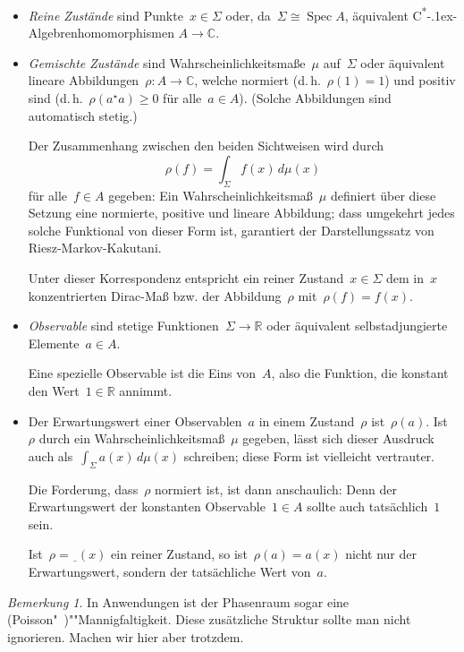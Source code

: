 \documentclass[a4paper,ngerman,12pt]{scrartcl}
\theoremstyle{definition}
\theoremstyle{plain}
\theoremstyle{remark}
\newtheorem{bem}[defn]{Bemerkung}
\newcommand{\RR}{\mathbb{R}}
\newcommand{\CC}{\mathbb{C}}
\newcommand{\freist}{\underline{\ \ }}
\newcommand{\csalgebren}{C\textsuperscript{*}\kern-.1ex-Alge\-bren}
\DeclareMathOperator{\Spec}{Spec}
\renewcommand{\_}{\mathpunct{.}\,}
\newcommand{\?}{\,{:}\,}
\begin{document}
\begin{itemize}
\item \emph{Reine Zustände} sind Punkte~$x \in \Sigma$ oder, da~$\Sigma \cong \Spec
A$, äquivalent \csalgebren{}\-ho\-mo\-mor\-phis\-men $A \to \CC$.

\item \emph{Gemischte Zustände} sind Wahrscheinlichkeitsmaße~$\mu$ auf~$\Sigma$ oder
äquivalent lineare Abbildungen~$\rho : A \to \CC$, welche normiert
(d.\,h.~$\rho(1) = 1$) und positiv sind (d.\,h.~$\rho(a^\star a) \geq 0$
für alle~$a \in A$). (Solche Abbildungen sind automatisch stetig.)

Der Zusammenhang zwischen den beiden Sichtweisen wird durch
\[ \rho(f) = \int_\Sigma f(x) \,d\mu(x) \]
für alle~$f \in A$ gegeben: Ein Wahrscheinlichkeitsmaß~$\mu$ definiert über
diese Setzung eine normierte, positive und lineare Abbildung; dass umgekehrt
jedes solche Funktional von dieser Form ist, garantiert der Darstellungssatz
von Riesz-Markov-Kakutani.

Unter dieser Korrespondenz entspricht ein reiner Zustand~$x \in \Sigma$ dem
in~$x$ konzentrierten Dirac-Maß bzw. der Abbildung~$\rho$ mit~$\rho(f) =
f(x)$.

\item \emph{Observable} sind stetige Funktionen~$\Sigma \to \RR$ oder
äquivalent selbstadjungierte Elemente~$a \in A$.

Eine spezielle Observable ist die Eins von~$A$, also die Funktion, die konstant
den Wert~$1 \in \RR$ annimmt.

\item Der Erwartungswert einer Observablen~$a$ in einem Zustand~$\rho$
ist~$\rho(a)$. Ist~$\rho$ durch ein Wahrscheinlichkeitsmaß~$\mu$ gegeben,
lässt sich dieser Ausdruck auch als~$\int_\Sigma a(x) \,d\mu(x)$ schreiben;
diese Form ist vielleicht vertrauter.

Die Forderung, dass~$\rho$ normiert ist, ist dann anschaulich: Denn der
Erwartungswert der konstanten Observable~$1 \in A$ sollte auch tatsächlich~$1$
sein.

Ist~$\rho = \freist(x)$ ein reiner Zustand, so ist~$\rho(a) = a(x)$ nicht nur
der Erwartungswert, sondern der tatsächliche Wert von~$a$.
\end{itemize}

\begin{bem}In Anwendungen ist der Phasenraum sogar eine
(Poisson"~)""Mannigfaltigkeit. Diese zusätzliche Struktur sollte man nicht
ignorieren. Machen wir hier aber trotzdem.\end{bem}
\end{document}
